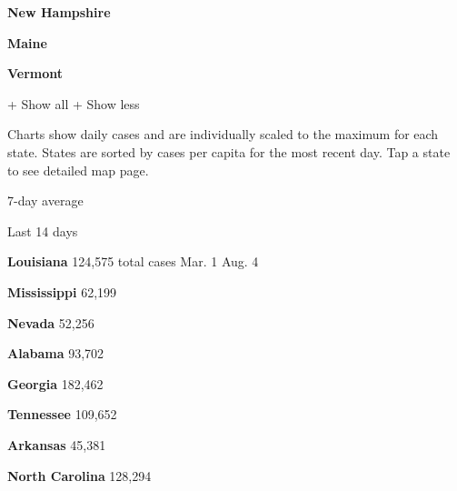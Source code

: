 \textbf{New Hampshire}

\href{https://www.nytimes3xbfgragh.onion/interactive/2020/us/maine-coronavirus-cases.html}{}

\textbf{Maine}

\href{https://www.nytimes3xbfgragh.onion/interactive/2020/us/vermont-coronavirus-cases.html}{}

\textbf{Vermont}

+ Show all + Show less

Charts show daily cases and are individually scaled to the maximum for
each state. States are sorted by cases per capita for the most recent
day. Tap a state to see detailed map page.

\href{https://www.nytimes3xbfgragh.onion/interactive/2020/us/louisiana-coronavirus-cases.html}{}

7-day average

Last 14 days

\textbf{Louisiana} 124,575 total cases Mar. 1 Aug. 4

\href{https://www.nytimes3xbfgragh.onion/interactive/2020/us/mississippi-coronavirus-cases.html}{}

\textbf{Mississippi} 62,199

\href{https://www.nytimes3xbfgragh.onion/interactive/2020/us/nevada-coronavirus-cases.html}{}

\textbf{Nevada} 52,256

\href{https://www.nytimes3xbfgragh.onion/interactive/2020/us/alabama-coronavirus-cases.html}{}

\textbf{Alabama} 93,702

\href{https://www.nytimes3xbfgragh.onion/interactive/2020/us/georgia-coronavirus-cases.html}{}

\textbf{Georgia} 182,462

\href{https://www.nytimes3xbfgragh.onion/interactive/2020/us/tennessee-coronavirus-cases.html}{}

\textbf{Tennessee} 109,652

\href{https://www.nytimes3xbfgragh.onion/interactive/2020/us/arkansas-coronavirus-cases.html}{}

\textbf{Arkansas} 45,381

\href{https://www.nytimes3xbfgragh.onion/interactive/2020/us/north-carolina-coronavirus-cases.html}{}

\textbf{North Carolina} 128,294

\href{https://www.nytimes3xbfgragh.onion/interactive/2020/us/wisconsin-coronavirus-cases.html}{}


